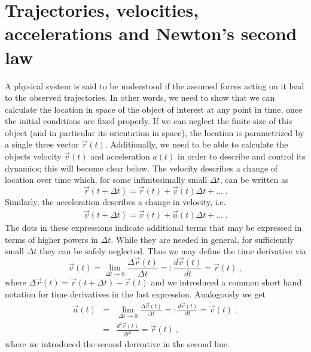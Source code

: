 \documentclass[12pt,ngerman,american]{iopart}
\begin{document}
\section{Trajectories, velocities, accelerations and Newton's second law}\label{sec:tva}

A physical system is said to be understood if the assumed forces acting on it lead to the observed trajectories.
In other words, we need to show that we can calculate the location in space of the object of interest at any point in time, once the initial conditions are fixed properly.
If we can neglect the finite size of this object (and in particular its orientation in space), the location is parametrized by a single three vector $\vec r(t)$.
Additionally, we need to be able to calculate the objects velocity $\vec v(t)$ and acceleration $a(t)$ in order to describe and control its dynamics; this will become clear below. The velocity describes a change of location over time which, for some infinitesimally small $\Delta t$, can be written as
\begin{equation}\label{eq:x_update}
\vec r(t+\Delta t) = \vec r(t) + \vec v(t) \Delta t + \ldots \ . \label{eq:vdef}
\end{equation}
Similarly, the acceleration describes a change in velocity, i.e.
\begin{eqnarray}\label{eq:v_update}
\vec v(t+\Delta t) = \vec v(t) + \vec a(t) \Delta t + \ldots\ . \label{eq:adef}
\end{eqnarray}
The dots in these expressions indicate additional terms that may be expressed in terms of higher powers in $\Delta t$. While they are needed in general, for sufficiently small $\Delta t$ they can be safely neglected.
Thus we may define the time derivative via
\begin{equation}
\vec v(t) = \lim_{\Delta t\to 0} \frac{\Delta \vec r(t)}{\Delta t} =: \frac{d\vec r(t)}{d t}  = \dot{\vec  r}(t) \ ,
\end{equation}
where $\Delta \vec r(t)=\vec r(t+\Delta t)-\vec r(t)$ and we introduced a common short hand notation for time derivatives in the last expression.
Analogously we get
\begin{eqnarray}
\vec a(t) &=& \lim_{\Delta t\to 0} \frac{\Delta \vec v(t)}{\Delta t} =: \frac{d\vec v(t)}{dt}  = \dot{\vec v}(t) \ , \\
 &=& \frac{d^2\vec r(t)}{dt^2}  = \ddot{\vec r}(t) \ ,
\end{eqnarray}
where we introduced the second derivative in the second line.
\end{document}

